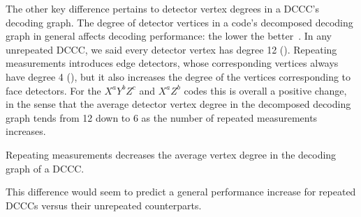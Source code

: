 The other key difference pertains to detector vertex degrees in a DCCC's decoding graph.
The degree of detector vertices in a code's decomposed decoding graph in general affects decoding performance: the lower the better~\cite{OscarSubsystemGaugeFixing}.
In any unrepeated DCCC, we said every detector vertex has degree 12 ().
Repeating measurements introduces edge detectors, whose corresponding vertices always have degree 4 (),
but it also increases the degree of the vertices corresponding to face detectors.
For the $X^a Y^b Z^c$ and $X^a Z^b$ codes this is overall a positive change,
in the sense that the average detector vertex degree in the decomposed decoding graph tends from 12 down to 6 as the number of repeated measurements increases.

\begin{difference}\label{dif:repeating_decoding_graph_degrees}
Repeating measurements decreases the average vertex degree in the decoding graph of a DCCC.
\end{difference}

This difference would seem to predict a general performance increase for repeated DCCCs versus their unrepeated counterparts.

